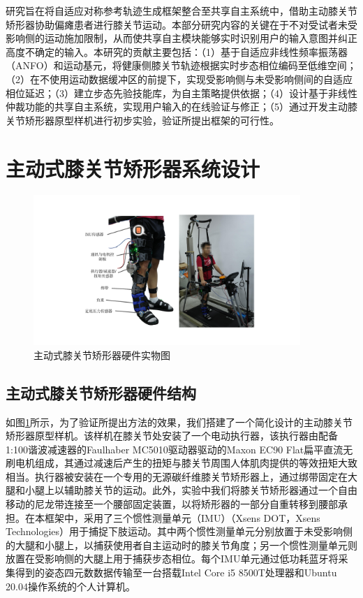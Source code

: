 研究旨在将自适应对称参考轨迹生成框架整合至共享自主系统中，借助主动膝关节矫形器协助偏瘫患者进行膝关节运动。本部分研究内容的关键在于不对受试者未受影响侧的运动施加限制，从而使共享自主模块能够实时识别用户的输入意图并纠正高度不确定的输入。本研究的贡献主要包括：（1）基于自适应非线性频率振荡器（ANFO）和运动基元，将健康侧膝关节轨迹根据实时步态相位编码至低维空间；（2）在不使用运动数据缓冲区的前提下，实现受影响侧与未受影响侧间的自适应相位延迟；（3）建立步态先验技能库，为自主策略提供依据；（4）设计基于非线性仲裁功能的共享自主系统，实现用户输入的在线验证与修正；（5）通过开发主动膝关节矫形器原型样机进行初步实验，验证所提出框架的可行性。

\section{主动式膝关节矫形器系统设计}
\begin{figure}[!t]
  \centering\includegraphics[width=0.9\textwidth]{figures/5-Fig-1.pdf}
  \caption{主动式膝关节矫形器硬件实物图}
  \label{fig:5-1}
\end{figure}
\subsection{主动式膝关节矫形器硬件结构}
如图\ref{fig:5-1}所示，为了验证所提出方法的效果，我们搭建了一个简化设计的主动膝关节矫形器原型样机。该样机在膝关节处安装了一个电动执行器，该执行器由配备1:100谐波减速器的Faulhaber MC5010驱动器驱动的Maxon EC90 Flat扁平直流无刷电机组成，其通过减速后产生的扭矩与膝关节周围人体肌肉提供的等效扭矩大致相当。执行器被安装在一个专用的无源碳纤维膝关节矫形器上，通过绑带固定在大腿和小腿上以辅助膝关节的运动。此外，实验中我们将膝关节矫形器通过一个自由移动的尼龙带连接至一个腰部固定装置，以将矫形器的一部分自重转移到腰部承担。在本框架中，采用了三个惯性测量单元（IMU）（Xsens DOT，Xsens Technologies）用于捕捉下肢运动。其中两个惯性测量单元分别放置于未受影响侧的大腿和小腿上，以捕获使用者自主运动时的膝关节角度；另一个惯性测量单元则放置在受影响侧的大腿上用于捕获步态相位。每个IMU单元通过低功耗蓝牙将采集得到的姿态四元数数据传输至一台搭载Intel Core i5 8500T处理器和Ubuntu 20.04操作系统的个人计算机。

